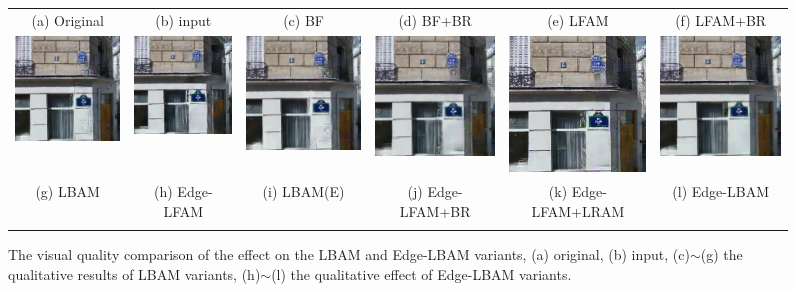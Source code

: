 \documentclass[10pt,journal,compsoc]{IEEEtran}
\begin{document}
\begin{figure}[hbt]
\begin{tabular}{cccccc}
		{\scriptsize{(a) Original}} & {\scriptsize{(b) input}} &{\scriptsize{(c) BF}} & {\scriptsize{(d) BF+BR}} & {\scriptsize{(e) LFAM}} & {\scriptsize{(f) LFAM+BR}}\\
		\includegraphics[width=.155\textwidth]{Ablation/LBAM/LBAM.png} &
		\includegraphics[width=.155\textwidth]{Ablation/LBAM/LEFAM.png} &
		\includegraphics[width=.155\textwidth]{Ablation/LBAM/LBAME.png} &
		\includegraphics[width=.155\textwidth]{Ablation/LBAM/LEFAM+BR.png} &
		\includegraphics[width=.155\textwidth]{Ablation/LBAM/LEFAM+LRAM.png} &
		\includegraphics[width=.155\textwidth]{Ablation/LBAM/lebam.png} \\
		{\scriptsize{(g) LBAM}} & {\scriptsize{(h) Edge-LFAM}} & {\scriptsize{(i) LBAM(E)}} &{\scriptsize{(j) Edge-LFAM+BR}} & {\scriptsize{(k) Edge-LFAM+LRAM}} & {\scriptsize{(l) Edge-LBAM}} \\
		\vspace{-2mm}
		
	\end{tabular}
	\caption{The visual quality comparison of the effect on the LBAM and Edge-LBAM variants, (a) original, (b) input, (c)$\sim$(g) the qualitative results of LBAM variants, (h)$\sim$(l) the qualitative effect of Edge-LBAM variants.}
	\label{lbam_Edge-LBAM_variants}
\end{figure}
\end{document}
